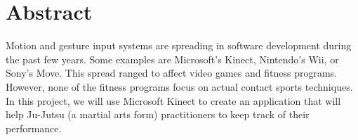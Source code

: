 \chapter*{Abstract}
\label{chap:abstract}
Motion and gesture input systems are spreading in software development during the past few years. Some examples are Microsoft's Kinect, Nintendo's Wii, or Sony's Move.
This spread ranged to affect video games and fitness programs. However, none of the fitness programs focus on actual contact sports techniques.
In this project, we will use Microsoft Kinect to create an application that will help Ju-Jutsu (a martial arts form) practitioners to keep track of their performance.
